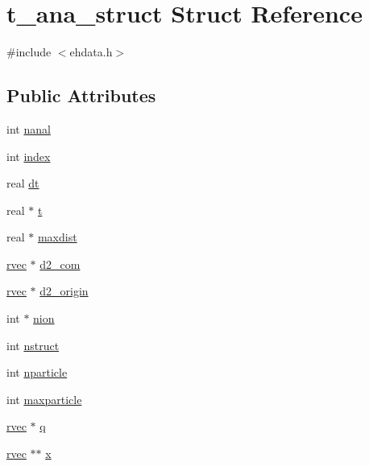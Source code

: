 \hypertarget{structt__ana__struct}{\section{t\-\_\-ana\-\_\-struct \-Struct \-Reference}
\label{structt__ana__struct}
}


{\ttfamily \#include $<$ehdata.\-h$>$}

\subsection*{\-Public \-Attributes}
\begin{DoxyCompactItemize}
\item 
int \hyperlink{structt__ana__struct_a17c2b23dec2eb431c3e09156749653a1}{nanal}
\item 
int \hyperlink{structt__ana__struct_aa59e99da4b56fbcc26ecd1b5b2495152}{index}
\item 
real \hyperlink{structt__ana__struct_a94b434b35ad6f9759b11db490874608b}{dt}
\item 
real $\ast$ \hyperlink{structt__ana__struct_ad70531ddfbb91a6479c1592ec7bec208}{t}
\item 
real $\ast$ \hyperlink{structt__ana__struct_a9637f9b6249124cea24ec146e9051bd5}{maxdist}
\item 
\hyperlink{share_2template_2gromacs_2types_2simple_8h_aa02a552a4abd2f180c282a083dc3a999}{rvec} $\ast$ \hyperlink{structt__ana__struct_a91508dd0e25b61650c527878728c29d4}{d2\-\_\-com}
\item 
\hyperlink{share_2template_2gromacs_2types_2simple_8h_aa02a552a4abd2f180c282a083dc3a999}{rvec} $\ast$ \hyperlink{structt__ana__struct_ac22ae41f1edd1144fb1325b1fafcd8ca}{d2\-\_\-origin}
\item 
int $\ast$ \hyperlink{structt__ana__struct_a81adc81e1cfcb1fb3b0fc75505245ce1}{nion}
\item 
int \hyperlink{structt__ana__struct_a400c6f1c9849cfd78f4b313998480137}{nstruct}
\item 
int \hyperlink{structt__ana__struct_a81f8ed55163cc28a3555dcf5bc424556}{nparticle}
\item 
int \hyperlink{structt__ana__struct_a2b90a7586ff8a806ff2f9f6da013ee27}{maxparticle}
\item 
\hyperlink{share_2template_2gromacs_2types_2simple_8h_aa02a552a4abd2f180c282a083dc3a999}{rvec} $\ast$ \hyperlink{structt__ana__struct_a6d40108281c79df2c677aecb7f4a4e3a}{q}
\item 
\hyperlink{share_2template_2gromacs_2types_2simple_8h_aa02a552a4abd2f180c282a083dc3a999}{rvec} $\ast$$\ast$ \hyperlink{structt__ana__struct_a23753615763ed9f03a778b689282e1d8}{x}
\end{DoxyCompactItemize}


